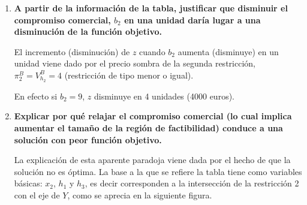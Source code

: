 \begin{enumerate}
    \item \textbf{A partir de la información de la tabla, justificar que disminuir el compromiso comercial, $b_2$ en una unidad daría lugar a una disminución de la función objetivo.}
    

    El incremento (disminución) de $z$ cuando $b_2$ aumenta (disminuye) en un unidad viene dado por el precio sombra de la segunda restricción, $\pi^B_2 = V^B_{h_2}=4$ (restricción de tipo menor o igual).

    En efecto si $b_2=9$, $z$ disminuye en 4 unidades (4000 euros).


    \item \textbf{Explicar por qué relajar el compromiso comercial (lo cual implica aumentar el tamaño de la región de factibilidad) conduce a una solución con peor función objetivo.}

    La explicación de esta aparente paradoja viene dada por el hecho de que la solución no es óptima. La base a la que se refiere la tabla tiene como variables básicas: $x_2$, $h_1$ y $h_3$, es decir corresponden a la intersección de la restricción 2 con el eje de $Y$, como se aprecia en la siguiente figura.

\end{enumerate}
